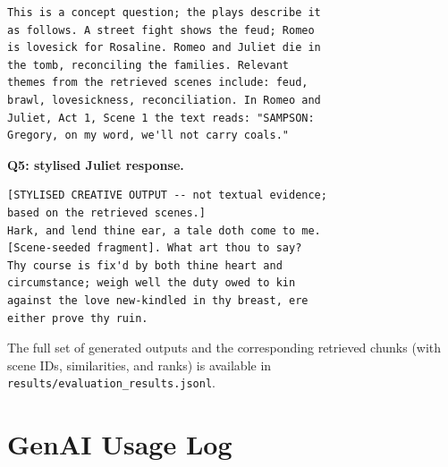 \documentclass[10pt,twocolumn,a4paper]{article}
\begin{document}
\begin{verbatim}
This is a concept question; the plays describe it
as follows. A street fight shows the feud; Romeo
is lovesick for Rosaline. Romeo and Juliet die in
the tomb, reconciling the families. Relevant
themes from the retrieved scenes include: feud,
brawl, lovesickness, reconciliation. In Romeo and
Juliet, Act 1, Scene 1 the text reads: "SAMPSON:
Gregory, on my word, we'll not carry coals."
\end{verbatim}

\textbf{Q5: stylised Juliet response.}

\begin{verbatim}
[STYLISED CREATIVE OUTPUT -- not textual evidence;
based on the retrieved scenes.]
Hark, and lend thine ear, a tale doth come to me.
[Scene-seeded fragment]. What art thou to say?
Thy course is fix'd by both thine heart and
circumstance; weigh well the duty owed to kin
against the love new-kindled in thy breast, ere
either prove thy ruin.
\end{verbatim}

The full set of generated outputs and the corresponding retrieved
chunks (with scene IDs, similarities, and ranks) is available in
\verb|results/evaluation_results.jsonl|.

\section{GenAI Usage Log}
\label{app:genai-log}
\end{document}

